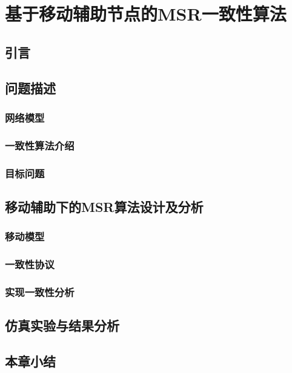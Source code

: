 \chapter{基于移动辅助节点的MSR一致性算法}

\section{引言}

\section{问题描述}

\subsection{网络模型}

\subsection{一致性算法介绍}

\subsection{目标问题}

\section{移动辅助下的MSR算法设计及分析}

\subsection{移动模型}

\subsection{一致性协议}

\subsection{实现一致性分析}

\section{仿真实验与结果分析}

\section{本章小结}

